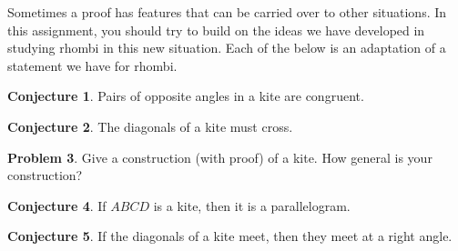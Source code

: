 \documentclass{tufte-handout}
\theoremstyle{definition}
\newtheorem{problem}{Problem}[section]
\newtheorem{conjecture}[problem]{Conjecture}
\begin{document}
Sometimes a proof has features that can be carried over to other situations. 
In this assignment, you should try to build on the ideas we have developed in studying rhombi in this new situation.
Each of the below is an adaptation of a statement we have for rhombi.

\begin{conjecture}\label{conj:kite-opp-angles} 
Pairs of opposite angles in a kite are congruent.
\end{conjecture}

\begin{conjecture}\label{conj:kite-diagonals-cross} 
The diagonals of a kite must cross.
\end{conjecture}

\begin{problem}\label{prob:construct-kites} 
Give a construction (with proof) of a kite. 
How general is your construction? 
\end{problem}

\begin{conjecture}\label{conj:kite-is-parallelogram} 
If $ABCD$ is a kite, then it is a parallelogram.
\end{conjecture}

\begin{conjecture}\label{conj:kite-diagonals-perpendicular} 
If the diagonals of a kite meet, then they meet at a right angle.
\end{conjecture}

\vfill
\end{document}
